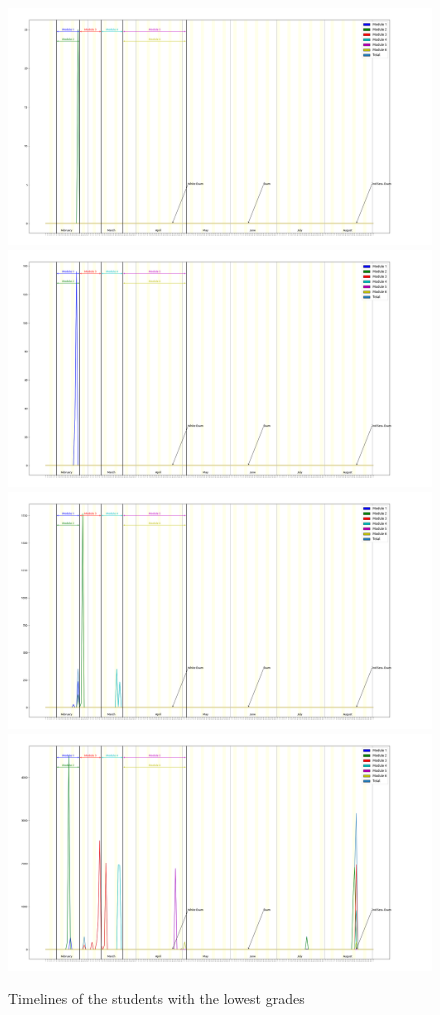 \documentclass[a4paper,11pt]{report}
\numberwithin{figure}{chapter} %
\begin{document}
      \begin{figure}[H]
      \centering
  	  \includegraphics[width=.48\linewidth]{images/bad_timeline_7110523.png}
  	  \includegraphics[width=.48\linewidth]{images/bad_timeline_6370413.png}
      \\
      \includegraphics[width=.48\linewidth]{images/bad_timeline_5897419.png}
      \includegraphics[width=.48\linewidth]{images/bad_timeline_3905979.png}
      \caption{Timelines of the students with the lowest grades}
      \label{fig:tm1}
      \end{figure}
\end{document}
